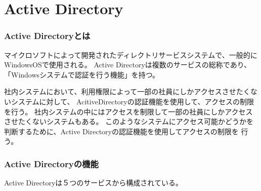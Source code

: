 \documentclass[11pt,a4j,titlepage]{jreport}
\begin{document}
\section{Active Directory}\label{Active Directory}
\subsubsection*{Active Directoryとは}
マイクロソフトによって開発されたディレクトリサービスシステム\cite{active}で、一般的にWindowsOSで使用される。
Active Directoryは複数のサービスの総称であり、「Windowsシステムで認証を行う機能」を持つ。

社内システムにおいて、利用権限によって一部の社員にしかアクセスさせたくないシステムに対して、
AcitiveDirectoryの認証機能を使用して、アクセスの制限を行う\cite{activedirectory}。
社内システムの中にはアクセスを制限して一部の社員にしかアクセスさせたくないシステムもある。
このようなシステムにアクセス可能かどうかを判断するために、Active Directoryの認証機能\cite{activedirectorydomainservices}を使用してアクセスの制限を
行う。
\fi
\subsubsection*{Active Directoryの機能}

Active Directoryは５つのサービスから構成されている。
\end{document}
